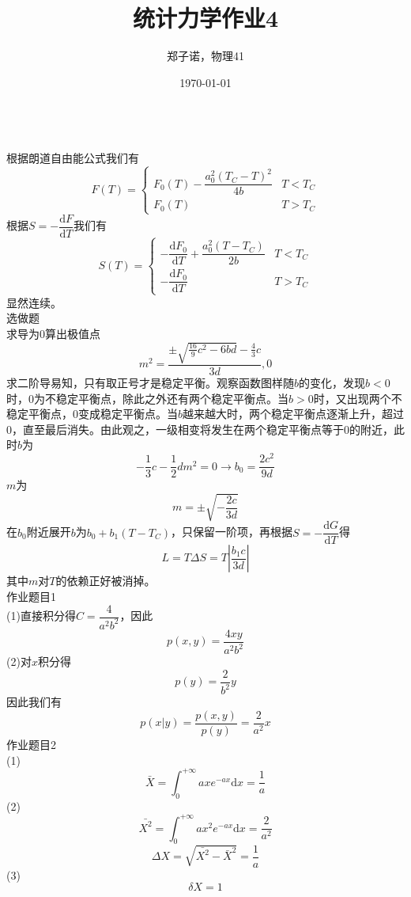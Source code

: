 \documentclass[utf8]{ctexart}
\title{统计力学作业4}
\author{郑子诺，物理41}
\date{\today}
\begin{document}
\maketitle
{}\\
根据朗道自由能公式我们有
\[F(T)=\begin{cases}
	F_0(T)-\dfrac{a_0^2(T_C-T)^2}{4b}&T<T_C\\[8pt]
	F_0(T)&T>T_C
\end{cases}\]
根据$S=-\dfrac{\mathrm{d}F}{\mathrm{d}T}$我们有
\[S(T)=\begin{cases}
	-\dfrac{\mathrm{d}F_0}{\mathrm{d}T}+\dfrac{a_0^2(T-T_C)}{2b}&T<T_C\\[8pt]
	-\dfrac{\mathrm{d}F_0}{\mathrm{d}T}&T>T_C
\end{cases}\]
显然连续。\\
选做题\\
求导为$0$算出极值点
\[m^2=\frac{\pm\sqrt{\frac{16}{9}c^2-6bd}-\frac{4}{3}c}{3d},0\]
求二阶导易知，只有取正号才是稳定平衡。观察函数图样随$b$的变化，发现$b<0$时，$0$为不稳定平衡点，除此之外还有两个稳定平衡点。当$b>0$时，又出现两个不稳定平衡点，$0$变成稳定平衡点。当$b$越来越大时，两个稳定平衡点逐渐上升，超过$0$，直至最后消失。由此观之，一级相变将发生在两个稳定平衡点等于$0$的附近，此时$b$为
\[-\frac{1}{3}c-\frac{1}{2}dm^2=0\rightarrow b_0=\frac{2c^2}{9d}\]
$m$为
\[m=\pm\sqrt{-\frac{2c}{3d}}\]
在$b_0$附近展开$b$为$b_0+b_1(T-T_C)$，只保留一阶项，再根据$S=-\dfrac{\mathrm{d}G}{\mathrm{d}T}$得
\[L=T\Delta S=T\left|\frac{b_1c}{3d}\right|\]
其中$m$对$T$的依赖正好被消掉。\\
作业题目1\\
(1)直接积分得$C=\dfrac{4}{a^2b^2}$，因此
\[p(x,y)=\frac{4xy}{a^2b^2}\]
(2)对$x$积分得
\[p(y)=\frac{2}{b^2}y\]
因此我们有
\[p(x|y)=\frac{p(x,y)}{p(y)}=\frac{2}{a^2}x\]
作业题目2\\
(1)
\[\bar{X}=\int_{0}^{+\infty}axe^{-ax}\mathrm{d}x=\frac{1}{a}\]
(2)
\[\bar{X^2}=\int_{0}^{+\infty}ax^2e^{-ax}\mathrm{d}x=\frac{2}{a^2}\]
\[\Delta X=\sqrt{\bar{X^2}-\bar{X}^2}=\frac{1}{a}\]
(3)
\[\delta X=1\]
\end{document}
